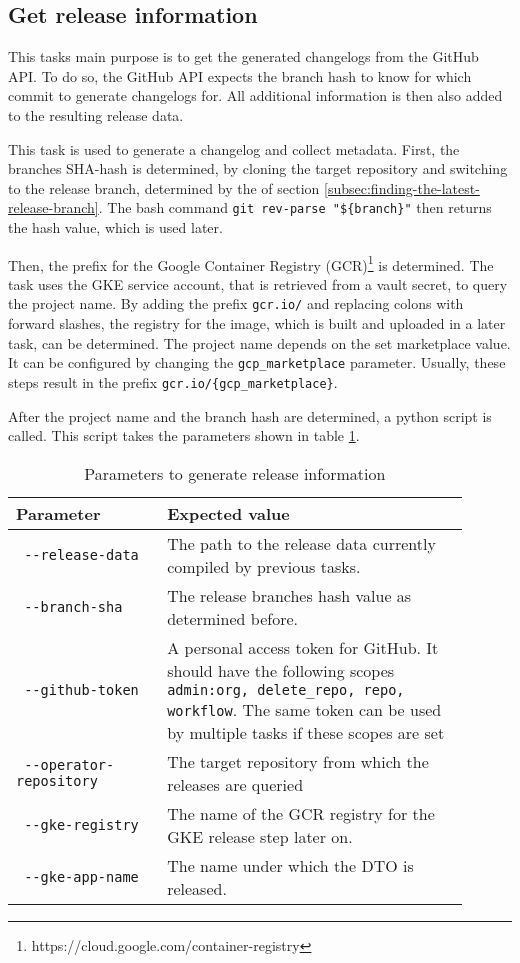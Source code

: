\subsection{Get release information}\label{subsec:get-release-information}

This tasks main purpose is to get the generated changelogs from the GitHub API.
To do so, the GitHub API expects the branch hash to know for which commit to generate changelogs for.
All additional information is then also added to the resulting release data.

This task is used to generate a changelog and collect metadata.
First, the branches SHA-hash is determined, by cloning the target repository and switching to the release branch, determined by the of section \ref{subsec:finding-the-latest-release-branch}.
The bash command \verb|git rev-parse "${branch}"| then returns the hash value, which is used later.

Then, the prefix for the Google Container Registry (GCR)\footnote{https://cloud.google.com/container-registry} is determined.
The task uses the GKE service account, that is retrieved from a vault secret, to query the project name.
By adding the prefix \verb|gcr.io/| and replacing colons with forward slashes, the registry for the image, which is built and uploaded in a later task, can be determined.
The project name depends on the set marketplace value.
It can be configured by changing the \verb|gcp_marketplace| parameter.
Usually, these steps result in the prefix \verb|gcr.io/{gcp_marketplace}|.

After the project name and the branch hash are determined, a python script is called.
This script takes the parameters shown in table \ref{tab:params-to-generate-release-information}.

\begin{table}[H]
    \centering
    \caption{Parameters to generate release information}
    \label{tab:params-to-generate-release-information}
    \begin{tabular}{p{0.3\linewidth}|p{0.6\linewidth}}
        Parameter & Expected value \\
        \hline
        \verb| --release-data | & The path to the release data currently compiled by previous tasks.  \\
        \verb| --branch-sha | & The release branches hash value as determined before. \\
        \verb| --github-token | & A personal access token for GitHub. It should have the following scopes \verb|admin:org, delete_repo, repo, workflow|. The same token can be used by multiple tasks if these scopes are set \\
        \verb| --operator-repository | & The target repository from which the releases are queried \\
        \verb| --gke-registry | & The name of the GCR registry for the GKE release step later on. \\
        \verb| --gke-app-name | & The name under which the DTO is released. \\
    \end{tabular}
\end{table}

